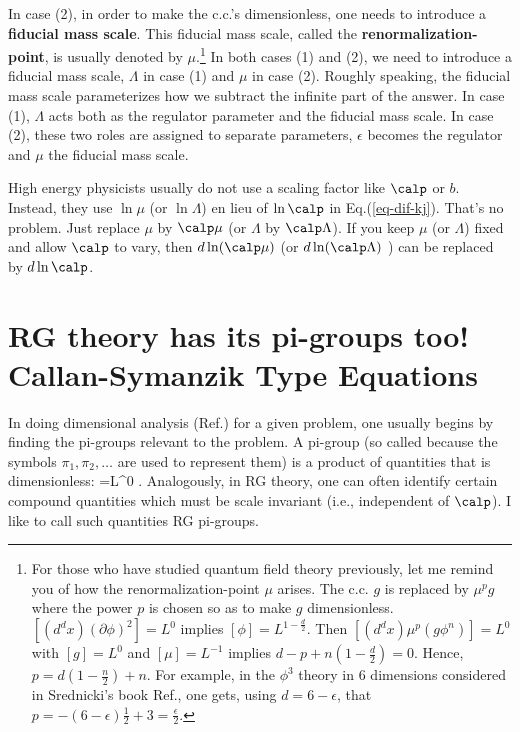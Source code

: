 In case (2), in order to make
the c.c.'s dimensionless,
one needs to introduce a
\textbf{fiducial mass scale}.
This fiducial mass scale,
called
the \textbf{renormalization-point},
is usually denoted by $\mu$.\footnote{
For those who have studied quantum
field theory previously, let me remind
you of how the
renormalization-point $\mu$ arises.
The c.c. $g$
is replaced by $\mu^p g$
where the power $p$
is chosen so as to make $g$
dimensionless.
$[(d^dx) (\partial \phi)^2]=L^0$
implies $[\phi]= L^{1-\frac{d}{2}}$. Then
$[(d^dx)  \mu^p (g\phi^n)] = L^0$ with
$[g]=L^0$ and $[\mu]=L^{-1}$
implies $d -p +n(1-\frac{d}{2})=0$.
Hence, $p=d(1-\frac{n}{2}) + n$.
For example, in the $\phi^3$
theory in 6 dimensions considered
in Srednicki's book Ref.\cite{Sr},
one gets, using $d = 6-\epsilon$, that
$p= -(6-\epsilon)\frac{1}{2} + 3
= \frac{\epsilon}{2}$.}
In both cases (1) and (2), we need to
introduce a fiducial mass scale,
$\Lambda$ in case (1) and $\mu$ in case (2).
Roughly speaking,
the fiducial mass scale
parameterizes
how we
subtract the infinite
part of the answer.
In case (1),
$\Lambda$ acts both as
the regulator parameter and
the fiducial mass scale.
In case (2), these
two roles are assigned to
separate parameters, $\epsilon$
becomes the regulator and
$\mu$ the fiducial mass scale.

High energy physicists
usually do not use a scaling factor
like $\calp$ or $b$. Instead, they
use $\ln \mu$ (or $\ln \Lambda$)
en lieu of $\ln \calp$
in Eq.(\ref{eq-dif-kj}).
That's no problem. Just replace
$\mu$ by $\calp \mu$ (or
$\Lambda$ by $\calp \Lambda$).
If you keep $\mu$
(or $\Lambda$) fixed and
allow $\calp$ to vary, then
$d\ln(\calp\mu)$ (or $d\ln(\calp\Lambda)$ )
can be replaced by $d\ln \calp$.

\section{RG theory has its pi-groups too!
Callan-Symanzik Type Equations}

In doing dimensional
analysis (Ref.\cite{wiki-da})
for a given problem, one
usually begins by finding the
 pi-groups relevant to the
problem. A pi-group (so called
because the symbols $\pi_1, \pi_2, \ldots$
are used to represent them)
is a product
of quantities that is dimensionless:
=L^0
\;.
\eeq
Analogously, in RG theory, one
can often identify certain compound
quantities which must be scale
invariant (i.e., independent
of $\calp$).
I like to call such
quantities RG pi-groups.

